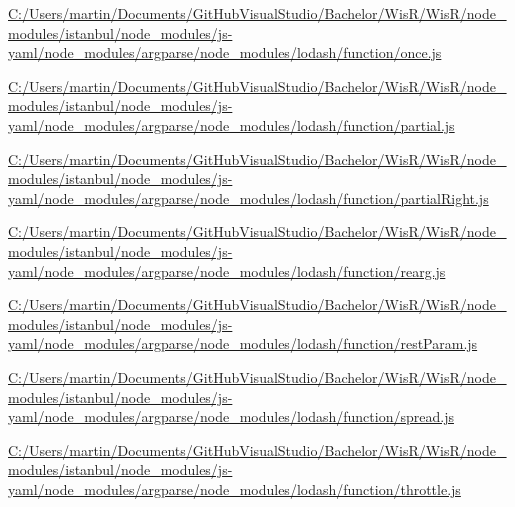 \begin{DoxyCompactItemize}
\item 
\hyperlink{_c_1_2_users_2martin_2_documents_2_git_hub_visual_studio_2_bachelor_2_wis_r_2_wis_r_2node_module52992ac669d521b4db389aada4261aaa}{C\+:/\+Users/martin/\+Documents/\+Git\+Hub\+Visual\+Studio/\+Bachelor/\+Wis\+R/\+Wis\+R/node\+\_\+modules/istanbul/node\+\_\+modules/js-\/yaml/node\+\_\+modules/argparse/node\+\_\+modules/lodash/function/once.\+js}
\item 
\hyperlink{_c_1_2_users_2martin_2_documents_2_git_hub_visual_studio_2_bachelor_2_wis_r_2_wis_r_2node_module7f33ccf67675cf21cca022ce1a790687}{C\+:/\+Users/martin/\+Documents/\+Git\+Hub\+Visual\+Studio/\+Bachelor/\+Wis\+R/\+Wis\+R/node\+\_\+modules/istanbul/node\+\_\+modules/js-\/yaml/node\+\_\+modules/argparse/node\+\_\+modules/lodash/function/partial.\+js}
\item 
\hyperlink{_c_1_2_users_2martin_2_documents_2_git_hub_visual_studio_2_bachelor_2_wis_r_2_wis_r_2node_module5a24d23c9aed4f49ccb05207c132c3c3}{C\+:/\+Users/martin/\+Documents/\+Git\+Hub\+Visual\+Studio/\+Bachelor/\+Wis\+R/\+Wis\+R/node\+\_\+modules/istanbul/node\+\_\+modules/js-\/yaml/node\+\_\+modules/argparse/node\+\_\+modules/lodash/function/partial\+Right.\+js}
\item 
\hyperlink{_c_1_2_users_2martin_2_documents_2_git_hub_visual_studio_2_bachelor_2_wis_r_2_wis_r_2node_modulecce61a15ebdcc64fe6a6f397d02c333c}{C\+:/\+Users/martin/\+Documents/\+Git\+Hub\+Visual\+Studio/\+Bachelor/\+Wis\+R/\+Wis\+R/node\+\_\+modules/istanbul/node\+\_\+modules/js-\/yaml/node\+\_\+modules/argparse/node\+\_\+modules/lodash/function/rearg.\+js}
\item 
\hyperlink{_c_1_2_users_2martin_2_documents_2_git_hub_visual_studio_2_bachelor_2_wis_r_2_wis_r_2node_module4648d27b59b2f4698324fc240228d9d0}{C\+:/\+Users/martin/\+Documents/\+Git\+Hub\+Visual\+Studio/\+Bachelor/\+Wis\+R/\+Wis\+R/node\+\_\+modules/istanbul/node\+\_\+modules/js-\/yaml/node\+\_\+modules/argparse/node\+\_\+modules/lodash/function/rest\+Param.\+js}
\item 
\hyperlink{_c_1_2_users_2martin_2_documents_2_git_hub_visual_studio_2_bachelor_2_wis_r_2_wis_r_2node_modulea7f316474b757c43d9fdea0493cc8bee}{C\+:/\+Users/martin/\+Documents/\+Git\+Hub\+Visual\+Studio/\+Bachelor/\+Wis\+R/\+Wis\+R/node\+\_\+modules/istanbul/node\+\_\+modules/js-\/yaml/node\+\_\+modules/argparse/node\+\_\+modules/lodash/function/spread.\+js}
\item 
\hyperlink{_c_1_2_users_2martin_2_documents_2_git_hub_visual_studio_2_bachelor_2_wis_r_2_wis_r_2node_moduleba657e74721a50cbe04c4f4ad3428f16}{C\+:/\+Users/martin/\+Documents/\+Git\+Hub\+Visual\+Studio/\+Bachelor/\+Wis\+R/\+Wis\+R/node\+\_\+modules/istanbul/node\+\_\+modules/js-\/yaml/node\+\_\+modules/argparse/node\+\_\+modules/lodash/function/throttle.\+js}

\end{DoxyCompactItemize}

